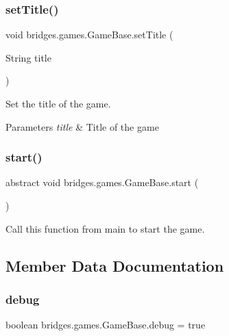 \subsubsection{\texorpdfstring{set\+Title()}{setTitle()}}
{\footnotesize\ttfamily void bridges.\+games.\+Game\+Base.\+set\+Title (\begin{DoxyParamCaption}\item[{String}]{title }\end{DoxyParamCaption})\hspace{0.3cm}{\ttfamily [protected]}}



Set the title of the game. 


\begin{DoxyParams}{Parameters}
{\em title} & Title of the game \\
\hline
\end{DoxyParams}
\mbox{\label{classbridges_1_1games_1_1_game_base_a4b09bc799726e4a59b1ab039b941b188}} 
\subsubsection{\texorpdfstring{start()}{start()}}
{\footnotesize\ttfamily abstract void bridges.\+games.\+Game\+Base.\+start (\begin{DoxyParamCaption}{ }\end{DoxyParamCaption})\hspace{0.3cm}{\ttfamily [abstract]}}



Call this function from main to start the game. 



\subsection{Member Data Documentation}
\mbox{\label{classbridges_1_1games_1_1_game_base_acfe2d7adaeac12868e8f4541a6458c26}} 
\subsubsection{\texorpdfstring{debug}{debug}}
{\footnotesize\ttfamily boolean bridges.\+games.\+Game\+Base.\+debug = true\hspace{0.3cm}{\ttfamily [protected]}}

